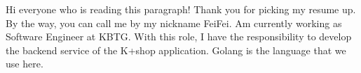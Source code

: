


\begin{cvparagraph}

    Hi everyone who is reading this paragraph! Thank you for picking my resume up. By the way, you can call me by my nickname FeiFei.
    Am currently working as Software Engineer at KBTG. With this role, I have the responsibility to develop the backend service of the K+shop application. Golang is the language that we use here.

\end{cvparagraph}
